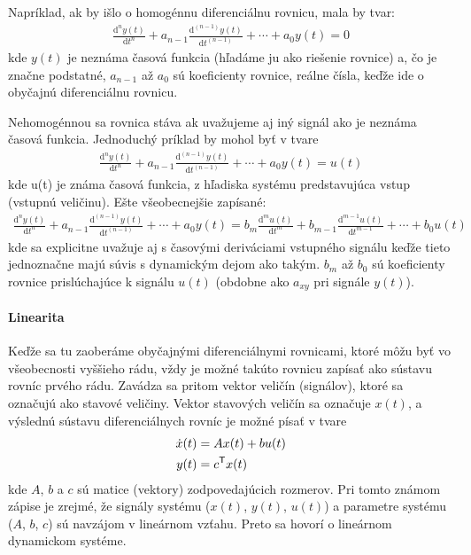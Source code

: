\documentclass[a4paper, 10pt, ]{article}
\begin{document}
Napríklad, ak by išlo o homogénnu diferenciálnu rovnicu, mala by tvar:
\begin{align} \label{vseobDifRov_h}
	\frac{\text{d}^n y(t)}{\text{d}t^n} + a_{n-1} \frac{\text{d}^{(n-1)} y(t)}{\text{d}t^{(n-1)}} + \cdots + a_0 y(t) = 0
\end{align}
kde $y(t)$ je neznáma časová funkcia (hľadáme ju ako riešenie rovnice) a, čo je značne podstatné, $a_{n-1}$ až $a_0$ sú koeficienty rovnice, reálne čísla, keďže ide o obyčajnú diferenciálnu rovnicu.

Nehomogénnou sa rovnica stáva ak uvažujeme aj iný signál ako je neznáma časová funkcia. Jednoduchý príklad by mohol byť v tvare
\begin{align} \label{vseobDifRov_nhj}
	\frac{\text{d}^n y(t)}{\text{d}t^n} + a_{n-1} \frac{\text{d}^{(n-1)} y(t)}{\text{d}t^{(n-1)}} + \cdots + a_0 y(t) = u(t)
\end{align}
kde u(t) je známa časová funkcia, z hľadiska systému predstavujúca vstup (vstupnú veličinu). Ešte všeobecnejšie zapísané:
\begin{align} \label{vseobDifRov_nh}
	\frac{\text{d}^n y(t)}{\text{d}t^n} + a_{n-1} \frac{\text{d}^{(n-1)} y(t)}{\text{d}t^{(n-1)}} + \cdots + a_0 y(t) = b_m \frac{\text{d}^m u(t)}{\text{d}t^m} + b_{m-1} \frac{\text{d}^{m-1} u(t)}{\text{d}t^{m-1}} + \cdots + b_0 u(t)
\end{align}
kde sa explicitne uvažuje aj s časovými deriváciami vstupného signálu keďže tieto jednoznačne majú súvis s dynamickým dejom ako takým. $b_{m}$ až $b_0$ sú koeficienty rovnice prislúchajúce k signálu $u(t)$ (obdobne ako $a_{xy}$ pri signále $y(t)$).


\paragraph{Linearita}

Keďže sa tu zaoberáme obyčajnými diferenciálnymi rovnicami, ktoré môžu byť vo všeobecnosti vyššieho rádu, vždy je možné takúto rovnicu zapísať ako sústavu rovníc prvého rádu. Zavádza sa pritom vektor veličín (signálov), ktoré sa označujú ako stavové veličiny. Vektor stavových veličín sa označuje $x(t)$, a výslednú sústavu diferenciálnych rovníc je možné písať v tvare
\begin{subequations} \label{LinearLTIsys}
\begin{align}
	\dot x(t) &= A x(t) + b u(t) \\
	y(t) &= c^{\mathsf{T}} x(t)
\end{align}
\end{subequations}
kde $A$, $b$ a $c$ sú matice (vektory) zodpovedajúcich rozmerov. Pri tomto známom zápise je zrejmé, že signály systému ($x(t)$, $y(t)$, $u(t)$) a parametre systému ($A$, $b$, $c$) sú navzájom v lineárnom vzťahu. Preto sa hovorí o lineárnom dynamickom systéme.
\end{document}
